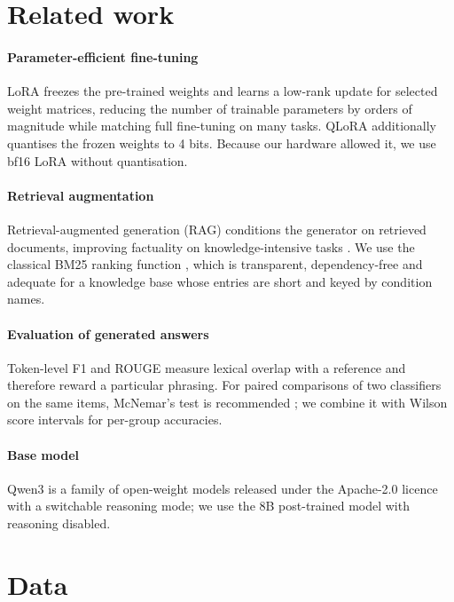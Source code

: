 \documentclass[5p,times,authoryear]{elsarticle}
\begin{document}
\section{Related work}
\label{sec:related}

\paragraph{Parameter-efficient fine-tuning} LoRA \citep{hu2022lora} freezes the pre-trained weights and learns a low-rank update for selected weight matrices, reducing the number of trainable parameters by orders of magnitude while matching full fine-tuning on many tasks. QLoRA \citep{dettmers2023qlora} additionally quantises the frozen weights to 4 bits. Because our hardware allowed it, we use bf16 LoRA without quantisation.

\paragraph{Retrieval augmentation} Retrieval-augmented generation (RAG) conditions the generator on retrieved documents, improving factuality on knowledge-intensive tasks \citep{lewis2020rag}. We use the classical BM25 ranking function \citep{robertson2009bm25}, which is transparent, dependency-free and adequate for a knowledge base whose entries are short and keyed by condition names.

\paragraph{Evaluation of generated answers} Token-level F1 \citep{rajpurkar2016squad} and ROUGE \citep{lin2004rouge} measure lexical overlap with a reference and therefore reward a particular phrasing. For paired comparisons of two classifiers on the same items, McNemar's test is recommended \citep{mcnemar1947,dietterich1998}; we combine it with Wilson score intervals \citep{wilson1927} for per-group accuracies.

\paragraph{Base model} Qwen3 \citep{yang2025qwen3} is a family of open-weight models released under the Apache-2.0 licence with a switchable reasoning mode; we use the 8B post-trained model with reasoning disabled.

\section{Data}
\label{sec:data}
\end{document}

